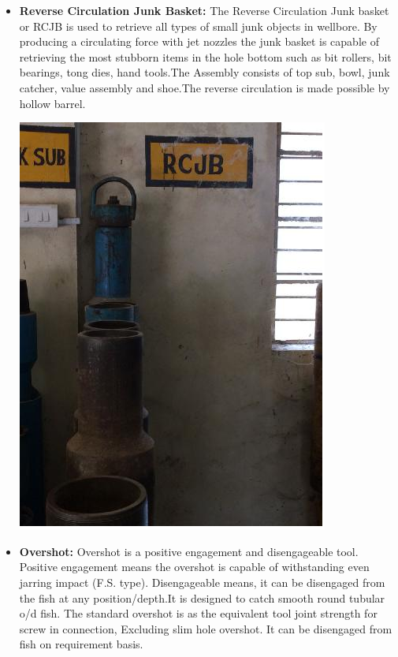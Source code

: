 \begin{itemize}
\item \textbf{Reverse Circulation Junk Basket:} The Reverse Circulation Junk
basket or RCJB is used to retrieve all types of small junk objects in
wellbore. By producing a circulating force with jet nozzles the junk
basket is capable of retrieving the most stubborn items in the hole
bottom such as bit rollers, bit bearings, tong dies, hand tools.The Assembly consists of top sub, bowl, junk catcher, value
assembly and shoe.The reverse circulation is made possible by hollow barrel.

\includegraphics[scale=0.3]{images/RJCB}


\item \textbf{Overshot:} Overshot is a positive engagement and disengageable tool.
Positive engagement means the overshot is capable of withstanding
even jarring impact (F.S. type). Disengageable means, it can be
disengaged from the fish at any position/depth.It is designed to catch smooth round tubular o/d fish.
The standard overshot is as the equivalent tool joint strength for screw in
connection, Excluding slim hole overshot. It can be disengaged
from fish on requirement basis.


\end{itemize}
